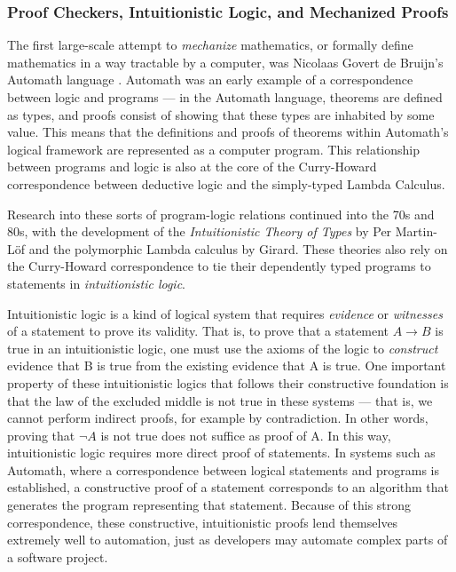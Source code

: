 \subsubsection{Proof Checkers, Intuitionistic Logic, and Mechanized Proofs}\label{sxn:mech_background}
The first large-scale attempt to \textit{mechanize} mathematics, or formally define mathematics in a way tractable by a computer, was Nicolaas Govert de Bruijn's Automath language \cite{nederpelt_survey_1994}. Automath was an early example of a correspondence between logic and programs --- in the Automath language, theorems are defined as types, and proofs consist of showing that these types are inhabited by some value. This means that the definitions and proofs of theorems within Automath's logical framework are represented as a computer program. This relationship between programs and logic is also at the core of the Curry-Howard correspondence between deductive logic and the simply-typed Lambda Calculus.

Research into these sorts of program-logic relations continued into the 70s and 80s, with the development of the \textit{Intuitionistic Theory of Types} \cite{martin-lof_intuitionistic_1998} by Per Martin-Löf and the polymorphic Lambda calculus \cite{girard_interpretation_1972} by Girard. These theories also rely on the Curry-Howard correspondence to tie their dependently typed programs to statements in \textit{intuitionistic logic}. 

Intuitionistic logic is a kind of logical system that requires \textit{evidence} or \textit{witnesses} of a statement to prove its validity. That is, to prove that a statement $A \xrightarrow{} B$ is true in an intuitionistic logic, one must use the axioms of the logic to \textit{construct} evidence that B is true from the existing evidence that A is true. One important property of these intuitionistic logics that follows their constructive foundation is that the law of the excluded middle is not true in these systems --- that is, we cannot perform indirect proofs, for example by contradiction. In other words, proving that $\lnot A$ is not true does not suffice as proof of A. In this way, intuitionistic logic requires more direct proof of statements. In systems such as Automath, where a correspondence between logical statements and programs is established, a constructive proof of a statement corresponds to an algorithm that generates the program representing that statement. Because of this strong correspondence, these constructive, intuitionistic proofs lend themselves extremely well to automation, just as developers may automate complex parts of a software project.

